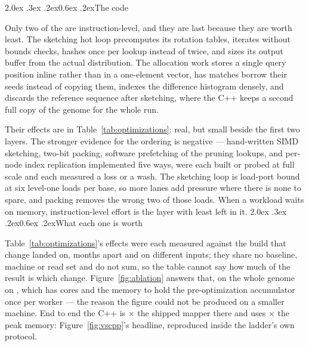 \documentclass[10pt,a4paper,twocolumn]{article}
\makeatletter
\renewcommand\section{\@startsection{section}{1}{0pt}%
  {2.0ex \@plus .3ex \@minus .2ex}{0.6ex \@plus.2ex}{\normalsize\bfseries}}
\makeatother
\begin{document}
\section{The code}



Only two of the \shmNumOptimizations{} are instruction-level, and they are last
because they are worth least. The sketching hot loop precomputes its rotation
tables, iterates without bounds checks, hashes once per lookup instead of twice,
and sizes its output buffer from the actual distribution. The allocation work
stores a single query position inline rather than in a one-element vector, has
matches borrow their seeds instead of copying them, indexes the difference
histogram densely, and discards the reference sequence after sketching, where
the C++ keeps a second full copy of the genome for the whole run.

Their effects are in Table~\ref{tab:optimizations}: real, but small beside the
first two layers. The stronger evidence for the ordering is negative ---
hand-written SIMD sketching, two-bit packing, software prefetching of the
pruning lookups, and per-node index replication implemented five ways, were each
built or probed at full scale and each measured a loss or a wash. The sketching
loop is load-port bound at six level-one loads per base, so more lanes add
pressure where there is none to spare, and packing removes the wrong two of
those loads. When a workload waits on memory, instruction-level effort is the
layer with least left in it.
\section{What each one is worth}

Table~\ref{tab:optimizations}'s effects were each measured against the build
that change landed on, months apart and on different inputs; they share no
baseline, machine or read set and do not sum, so the table cannot say how much
of the result is which change. Figure~\ref{fig:ablation} answers that, on the
whole genome on \shmAblHost{}, which has \shmAblCores{} cores and the memory
to hold the pre-optimization accumulator once per worker --- the reason the
figure could not be produced on a smaller machine. End to end the C++ is
\shmAblTotalX$\times$ the shipped mapper there and uses
\shmAblRssTotalX$\times$ the peak memory: Figure~\ref{fig:vscpp}'s headline,
reproduced inside the ladder's own protocol.
\end{document}
